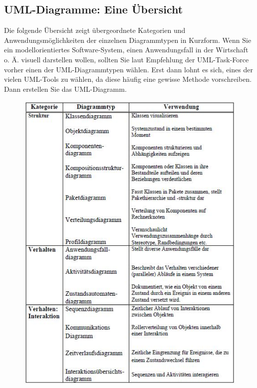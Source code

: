 \subsection{UML-Diagramme: Eine Übersicht}
Die folgende Übersicht zeigt übergeordnete Kategorien und Anwendungsmöglichkeiten der einzelnen Diagrammtypen in Kurzform. Wenn Sie ein modellorientiertes Software-System, einen Anwendungsfall in der Wirtschaft o. Ä. visuell darstellen wollen, sollten Sie laut Empfehlung der UML-Task-Force vorher einen der UML-Diagrammtypen wählen. Erst dann lohnt es sich, eines der vielen UML-Tools zu wählen, da diese häufig eine gewisse Methode vorschreiben. Dann erstellen Sie das UML-Diagramm.\\
\begin{center}
\begin{figure}[h]
   

\includegraphics[scale=0.8]{Graphics/UMLdiagramme.jpg} 


 
\label{fig5}


\end{figure}
\end{center}
\newpage
